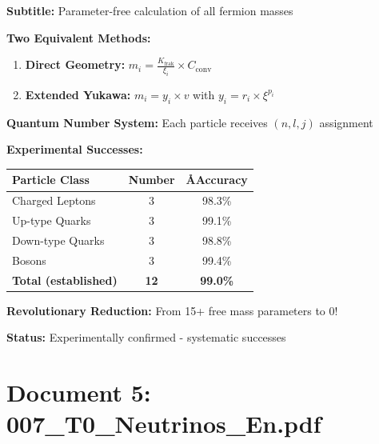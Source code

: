 	\begin{documentbox}
		\textbf{Subtitle:} Parameter-free calculation of all fermion masses
		
		\textbf{Two Equivalent Methods:}
		\begin{enumerate}
			\item \textbf{Direct Geometry:} $m_i = \frac{K_{\text{frak}}}{\xi_i} \times C_{\text{conv}}$
			\item \textbf{Extended Yukawa:} $m_i = y_i \times v$ with $y_i = r_i \times \xi^{p_i}$
		\end{enumerate}
		
		\textbf{Quantum Number System:} Each particle receives $(n,l,j)$ assignment
		
		\textbf{Experimental Successes:}
		\begin{center}
			\begin{tabular}{lcc}
				\toprule
				\textbf{Particle Class} & \textbf{Number} & \textbf{\AA  Accuracy} \\
				\midrule
				Charged Leptons & 3 & 98.3\% \\
				Up-type Quarks & 3 & 99.1\% \\
				Down-type Quarks & 3 & 98.8\% \\
				Bosons & 3 & 99.4\% \\
				\midrule
				\textbf{Total (established)} & \textbf{12} & \textbf{99.0\%} \\
				\bottomrule
			\end{tabular}
		\end{center}
		
		\textbf{Revolutionary Reduction:} From 15+ free mass parameters to 0!
		
		\textbf{Status:} Experimentally confirmed - systematic successes
	\end{documentbox}
	
	\section{Document 5: 007\_T0\_Neutrinos\_En.pdf}
	
